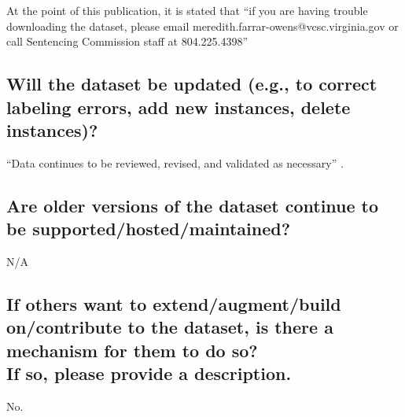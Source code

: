 \documentclass[letterpaper, 10 pt, conference]{ieeeconf}  %
\newcommand{\subtitle}[1]{{\\ \small \normalfont \color{purple} #1}}
\begin{document}
At the point of this publication, it is stated that ``if you are having trouble downloading the dataset, please email meredith.farrar-owens@vcsc.virginia.gov or call Sentencing Commission staff at 804.225.4398'' 

\subsection{Will the dataset be updated (e.g., to correct labeling errors, add new instances, delete instances)?}

``Data continues to be reviewed, revised, and validated as necessary'' \cite{codebook}.

\subsection{Are older versions of the dataset continue to be supported/hosted/maintained?}

N/A

\subsection{If others want to extend/augment/build on/contribute to the dataset, is there a mechanism for them to do so? \subtitle{If so, please provide a description.}}

No.

\medskip
 
  

\end{document}
